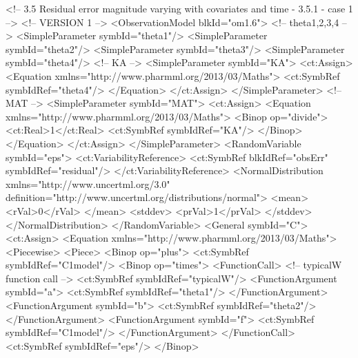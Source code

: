 \documentclass[a4paper,10pt]{article}
\begin{document}
\begin{xmlcode}
<!-- 3.5 Residual error magnitude varying with covariates and time - 3.5.1 - case 1 -->
<!-- VERSION 1 -->
<ObservationModel blkId="om1.6">
    <!-- theta1,2,3,4 -->
    <SimpleParameter symbId="theta1"/>
    <SimpleParameter symbId="theta2"/>
    <SimpleParameter symbId="theta3"/>
    <SimpleParameter symbId="theta4"/>
    <!-- KA -->
    <SimpleParameter symbId="KA">
        <ct:Assign>
            <Equation xmlns="http://www.pharmml.org/2013/03/Maths">
                <ct:SymbRef symbIdRef="theta4"/>
            </Equation>
        </ct:Assign>
    </SimpleParameter>
    <!-- MAT -->
    <SimpleParameter symbId="MAT">
        <ct:Assign>
            <Equation xmlns="http://www.pharmml.org/2013/03/Maths">
                <Binop op="divide">
                    <ct:Real>1</ct:Real>
                    <ct:SymbRef symbIdRef="KA"/>
                </Binop>
            </Equation>
        </ct:Assign>
    </SimpleParameter>
    <RandomVariable symbId="eps">
        <ct:VariabilityReference>
            <ct:SymbRef blkIdRef="obsErr" symbIdRef="residual"/>
        </ct:VariabilityReference>
        <NormalDistribution xmlns="http://www.uncertml.org/3.0" definition="http://www.uncertml.org/distributions/normal">
            <mean>
                <rVal>0</rVal>
            </mean>
            <stddev>
                <prVal>1</prVal>
            </stddev>
        </NormalDistribution>
    </RandomVariable>
    <General symbId="C">
        <ct:Assign>
            <Equation xmlns="http://www.pharmml.org/2013/03/Maths">
                <Piecewise>
                    <Piece>
                        <Binop op="plus">
                            <ct:SymbRef symbIdRef="C1model"/>
                            <Binop op="times">
                                <FunctionCall>			<!-- typicalW function call -->
                                    <ct:SymbRef symbIdRef="typicalW"/>
                                    <FunctionArgument symbId="a">
                                        <ct:SymbRef symbIdRef="theta1"/>
                                    </FunctionArgument>
                                    <FunctionArgument symbId="b">
                                        <ct:SymbRef symbIdRef="theta2"/>
                                    </FunctionArgument>
                                    <FunctionArgument symbId="f">
                                        <ct:SymbRef symbIdRef="C1model"/>
                                    </FunctionArgument>
                                </FunctionCall>
                                <ct:SymbRef symbIdRef="eps"/>
                            </Binop>

\end{xmlcode}
\end{document}
